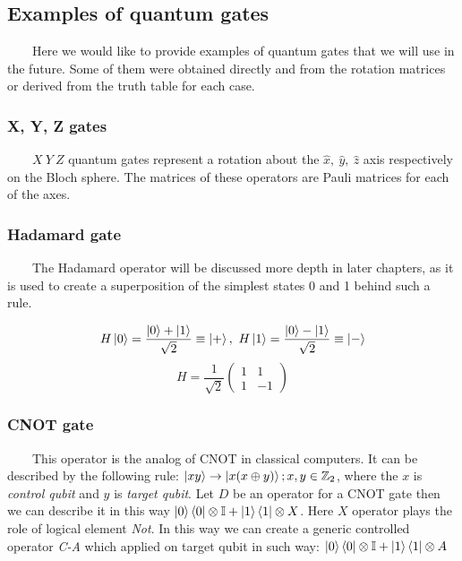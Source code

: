 \documentclass[english,14pt,a4paper]{article}
\begin{document}
	
	\subsection{Examples of quantum gates} \ \ \ \ 
	Here we would like to provide examples of quantum gates that we will use in the future. Some of them were obtained directly and from the rotation matrices or derived from the truth table for each case. 
	
	\subsubsection*{X, Y, Z gates}\ \ \ \
	\(X  \ Y \ Z\) quantum gates represent a rotation about the $\hat{x}, \ \hat{y}, \ \hat{z}$ axis respectively on the Bloch sphere. The matrices of these operators are Pauli matrices for each of the axes. 
	
	\subsubsection*{Hadamard gate}\ \ \ \
	The Hadamard operator will be discussed more depth in later chapters, as it is used to create a superposition of the simplest states 0 and 1 behind such a rule. 
	
	\[
		H \ket{0} = \frac{\ket{0} + \ket{1}}{\sqrt{2}} \equiv \ket{+}, \ H \ket{1} = \frac{\ket{0} - \ket{1}}{\sqrt{2}} \equiv \ket{-}
	\]
	\begin{equation}
	H = \frac{1}{\sqrt{2}} \begin{pmatrix} 1 & 1 \\ 1 & -1 \end{pmatrix}
	\end{equation}
	
	\subsubsection*{CNOT gate}\ \ \ \
	This operator is the analog of CNOT in classical computers. It can be described by the following rule: $\ket{xy} \rightarrow \ket{x (x \oplus y)}; x, y \in \mathbb{Z}_2$, where the $x$ is \textit{control qubit} and $y$ is \textit{target qubit}. Let $D$ be an operator for a CNOT gate then we can describe it in this way $\ket{0}\bra{0} \otimes \mathbb{I} + \ket{1}\bra{1} \otimes X$. Here $X$ operator plays the role of logical element \textit{Not}. In this way we can create a generic controlled operator \textit{C-A} which applied on target qubit in such way: $\ket{0}\bra{0} \otimes \mathbb{I} + \ket{1}\bra{1} \otimes A $
\end{document}
